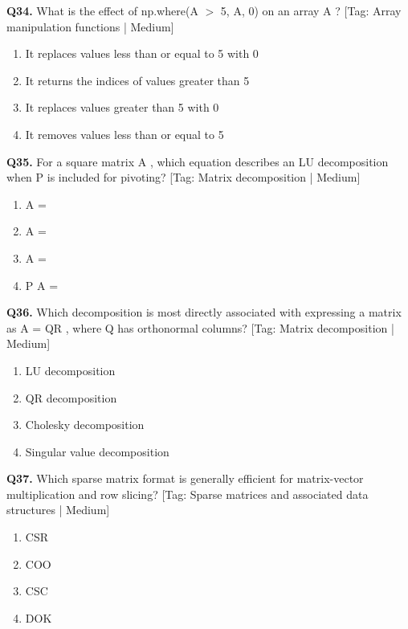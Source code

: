 \vspace{2mm}
\noindent\textbf{Q34.} What is the effect of np.where(A $>$ 5, A, 0) on an array A ? \hfill [Tag: Array manipulation functions | Medium]
\begin{enumerate}[label=(\alph*),topsep=2pt,itemsep=1pt,partopsep=0pt,parsep=0pt]
    \item {It replaces values less than or equal to 5 with 0}
    \item {It returns the indices of values greater than 5}
    \item {It replaces values greater than 5 with 0}
    \item {It removes values less than or equal to 5}
\end{enumerate}
\vspace{2mm}
\noindent\textbf{Q35.} For a square matrix A , which equation describes an LU decomposition when P is included for pivoting? \hfill [Tag: Matrix decomposition | Medium]
\begin{enumerate}[label=(\alph*),topsep=2pt,itemsep=1pt,partopsep=0pt,parsep=0pt]
    \item {A =}
    \item {A =}
    \item {A =}
    \item {P A =}
\end{enumerate}
\vspace{2mm}
\noindent\textbf{Q36.} Which decomposition is most directly associated with expressing a matrix as A = QR , where Q has orthonormal columns? \hfill [Tag: Matrix decomposition | Medium]
\begin{enumerate}[label=(\alph*),topsep=2pt,itemsep=1pt,partopsep=0pt,parsep=0pt]
    \item {LU decomposition}
    \item {QR decomposition}
    \item {Cholesky decomposition}
    \item {Singular value decomposition}
\end{enumerate}
\vspace{2mm}
\noindent\textbf{Q37.} Which sparse matrix format is generally efficient for matrix-vector multiplication and row slicing? \hfill [Tag: Sparse matrices and associated data structures | Medium]
\begin{enumerate}[label=(\alph*),topsep=2pt,itemsep=1pt,partopsep=0pt,parsep=0pt]
    \item {CSR}
    \item {COO}
    \item {CSC}
    \item {DOK}
\end{enumerate}

